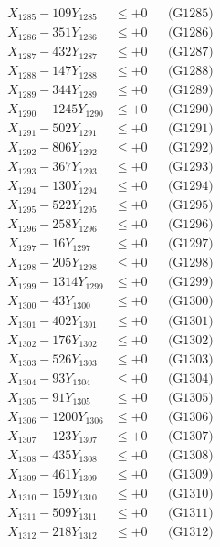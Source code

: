 \documentclass[a4paper,10pt]{article}
\begin{document}
{\begin{align}
X_{1285} - 109Y_{1285} &\leq +0 && \text{(G1285)} \\
X_{1286} - 351Y_{1286} &\leq +0 && \text{(G1286)} \\
X_{1287} - 432Y_{1287} &\leq +0 && \text{(G1287)} \\
X_{1288} - 147Y_{1288} &\leq +0 && \text{(G1288)} \\
X_{1289} - 344Y_{1289} &\leq +0 && \text{(G1289)} \\
X_{1290} - 1245Y_{1290} &\leq +0 && \text{(G1290)} \\
\allowbreak
X_{1291} - 502Y_{1291} &\leq +0 && \text{(G1291)} \\
X_{1292} - 806Y_{1292} &\leq +0 && \text{(G1292)} \\
X_{1293} - 367Y_{1293} &\leq +0 && \text{(G1293)} \\
X_{1294} - 130Y_{1294} &\leq +0 && \text{(G1294)} \\
X_{1295} - 522Y_{1295} &\leq +0 && \text{(G1295)} \\
X_{1296} - 258Y_{1296} &\leq +0 && \text{(G1296)} \\
X_{1297} - 16Y_{1297} &\leq +0 && \text{(G1297)} \\
X_{1298} - 205Y_{1298} &\leq +0 && \text{(G1298)} \\
X_{1299} - 1314Y_{1299} &\leq +0 && \text{(G1299)} \\
X_{1300} - 43Y_{1300} &\leq +0 && \text{(G1300)} \\
\allowbreak
X_{1301} - 402Y_{1301} &\leq +0 && \text{(G1301)} \\
X_{1302} - 176Y_{1302} &\leq +0 && \text{(G1302)} \\
X_{1303} - 526Y_{1303} &\leq +0 && \text{(G1303)} \\
X_{1304} - 93Y_{1304} &\leq +0 && \text{(G1304)} \\
X_{1305} - 91Y_{1305} &\leq +0 && \text{(G1305)} \\
X_{1306} - 1200Y_{1306} &\leq +0 && \text{(G1306)} \\
X_{1307} - 123Y_{1307} &\leq +0 && \text{(G1307)} \\
X_{1308} - 435Y_{1308} &\leq +0 && \text{(G1308)} \\
X_{1309} - 461Y_{1309} &\leq +0 && \text{(G1309)} \\
X_{1310} - 159Y_{1310} &\leq +0 && \text{(G1310)} \\
\allowbreak
X_{1311} - 509Y_{1311} &\leq +0 && \text{(G1311)} \\
X_{1312} - 218Y_{1312} &\leq +0 && \text{(G1312)} \\

\end{align}}
\end{document}
